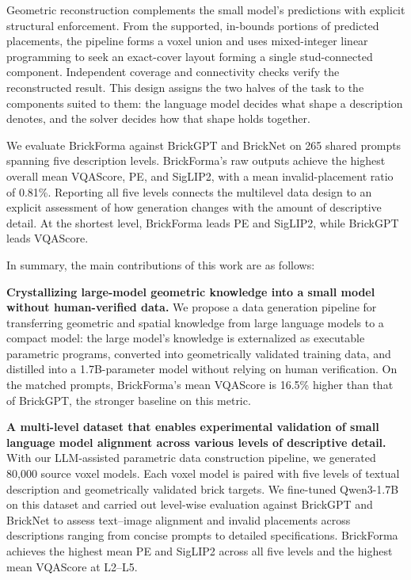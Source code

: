 Geometric reconstruction complements the small model's predictions with explicit structural enforcement. From the supported, in-bounds portions of predicted placements, the pipeline forms a voxel union and uses mixed-integer linear programming to seek an exact-cover layout forming a single stud-connected component. Independent coverage and connectivity checks verify the reconstructed result. This design assigns the two halves of the task to the components suited to them: the language model decides what shape a description denotes, and the solver decides how that shape holds together.

We evaluate BrickForma against BrickGPT and BrickNet on 265 shared prompts spanning five description levels. BrickForma's raw outputs achieve the highest overall mean VQAScore, PE, and SigLIP2, with a mean invalid-placement ratio of 0.81\%. Reporting all five levels connects the multilevel data design to an explicit assessment of how generation changes with the amount of descriptive detail. At the shortest level, BrickForma leads PE and SigLIP2, while BrickGPT leads VQAScore.

In summary, the main contributions of this work are as follows:

\textbf{Crystallizing large-model geometric knowledge into a small model 
without human-verified data.}
We propose a data generation pipeline for transferring geometric and 
spatial knowledge from large language models to a compact model: the 
large model's knowledge is externalized as executable parametric programs, 
converted into geometrically validated training data, and distilled into 
a 1.7B-parameter model without relying on human verification. 
On the matched prompts, BrickForma's mean VQAScore is 16.5\% higher than
that of BrickGPT, the stronger baseline on this metric.



\textbf{A multi-level dataset that enables experimental validation of small language model alignment across 
various levels of descriptive detail.}
With our LLM-assisted parametric data construction pipeline, we generated 80,000 
source voxel models. Each voxel model is paired with five levels of textual description 
and geometrically validated brick targets. We fine-tuned Qwen3-1.7B on this dataset and carried out level-wise evaluation 
against BrickGPT and BrickNet to assess text--image alignment and invalid 
placements across descriptions ranging from concise prompts to detailed 
specifications. BrickForma achieves the highest mean PE and SigLIP2 across all five levels
and the highest mean VQAScore at L2--L5.